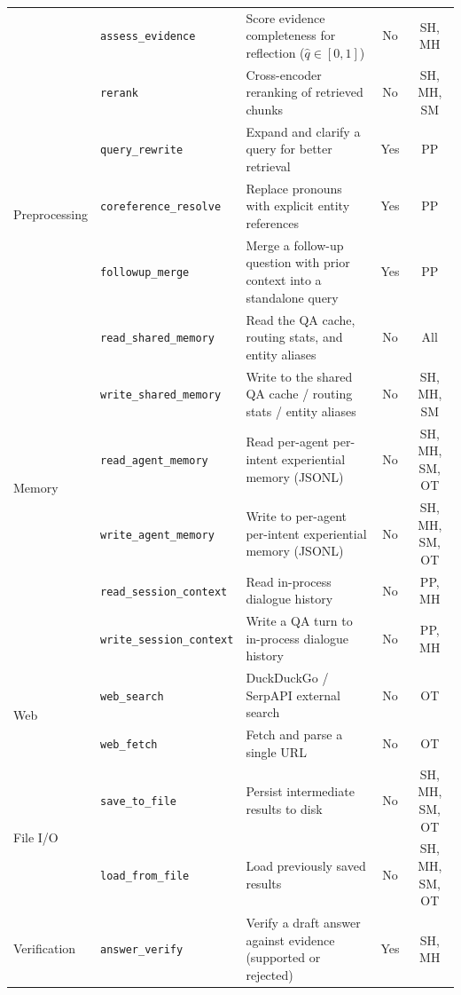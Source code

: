 \documentclass[11pt,a4paper]{article}
\newcommand{\tool}[1]{\texttt{\small #1}}
\begin{document}
\begin{table}[t]
\begin{tabular}{@{}lllcc@{}}
  & \tool{assess\_evidence}      & Score evidence completeness for reflection ($\hat{q}\in[0,1]$) & No & SH, MH \\
  & \tool{rerank}                & Cross-encoder reranking of retrieved chunks                & No  & SH, MH, SM \\
\midrule
\multirow{3}{*}{Preprocessing}
  & \tool{query\_rewrite}        & Expand and clarify a query for better retrieval               & Yes & PP \\
  & \tool{coreference\_resolve}  & Replace pronouns with explicit entity references            & Yes & PP \\
  & \tool{followup\_merge}       & Merge a follow-up question with prior context into a standalone query & Yes & PP \\
\midrule
\multirow{6}{*}{Memory}
  & \tool{read\_shared\_memory}   & Read the QA cache, routing stats, and entity aliases       & No  & All \\
  & \tool{write\_shared\_memory} & Write to the shared QA cache / routing stats / entity aliases & No  & SH, MH, SM \\
  & \tool{read\_agent\_memory}    & Read per-agent per-intent experiential memory (JSONL)      & No  & SH, MH, SM, OT \\
  & \tool{write\_agent\_memory}   & Write to per-agent per-intent experiential memory (JSONL)  & No  & SH, MH, SM, OT \\
  & \tool{read\_session\_context} & Read in-process dialogue history                           & No  & PP, MH \\
  & \tool{write\_session\_context} & Write a QA turn to in-process dialogue history             & No  & PP, MH \\
\midrule
\multirow{2}{*}{Web}
  & \tool{web\_search}           & DuckDuckGo / SerpAPI external search                       & No  & OT \\
  & \tool{web\_fetch}            & Fetch and parse a single URL                                & No  & OT \\
\midrule
\multirow{2}{*}{File I/O}
  & \tool{save\_to\_file}        & Persist intermediate results to disk                        & No  & SH, MH, SM, OT \\
  & \tool{load\_from\_file}      & Load previously saved results                               & No  & SH, MH, SM, OT \\
\midrule
\multirow{3}{*}{Verification}
  & \tool{answer\_verify}        & Verify a draft answer against evidence (supported or rejected)  & Yes & SH, MH \\

\end{tabular}
\end{table}
\end{document}
